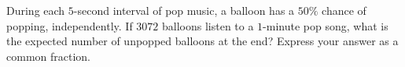During each $5$-second interval of pop music, a balloon has a $50\%$ chance of popping, independently. If $3072$ balloons listen to a $1$-minute pop song, what is the expected number of unpopped balloons at the end? Express your answer as a common fraction.
